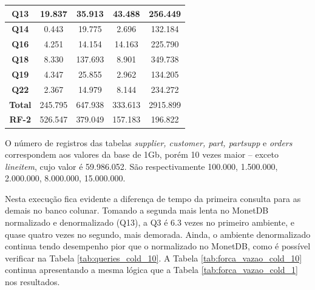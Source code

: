 \begin{table}[htpb]
\begin{tabular}{|c|c|c|c|c|}
        \textbf{Q13}   & 19.837                & 35.913                   & 43.488              & 256.449               \\ \hline
        \textbf{Q14}   & 0.443                 & 19.775                   & 2.696               & 132.184               \\ \hline
        \textbf{Q16}   & 4.251                 & 14.154                   & 14.163              & 225.790               \\ \hline
        \textbf{Q18}   & 8.330                 & 137.693                  & 8.901               & 349.738               \\ \hline
        \textbf{Q19}   & 4.347                 & 25.855                   & 2.962               & 134.205               \\ \hline
        \textbf{Q22}   & 2.367                 & 14.979                   & 8.144               & 234.272               \\ \hline
        \textbf{Total} & 245.795               & 647.938                  & 333.613             & 2915.899              \\ \hline
        \textbf{RF-2}  & 526.547               & 379.049                  & 157.183             & 196.822               \\ \hline

\end{tabular}
\end{table}

O número de registros das tabelas \textit{supplier, customer, part, partsupp} e \textit{orders} correspondem aos valores da base de 1Gb, porém 10 vezes maior -- exceto \textit{lineitem}, cujo valor é 59.986.052. São respectivamente 100.000, 1.500.000, 2.000.000, 8.000.000, 15.000.000.

Nesta execução fica evidente a diferença de tempo da primeira consulta para as demais no banco colunar. Tomando a segunda mais lenta no MonetDB normalizado e denormalizado (Q13), a Q3 é 6.3 vezes no primeiro ambiente, e quase quatro vezes no segundo, mais demorada. Ainda, o ambiente denormalizado continua tendo desempenho pior que o normalizado no MonetDB, como é possível verificar na Tabela \ref{tab:queries_cold_10}. A Tabela \ref{tab:forca_vazao_cold_10} continua apresentando a mesma lógica que a Tabela \ref{tab:forca_vazao_cold_1} nos resultados.

